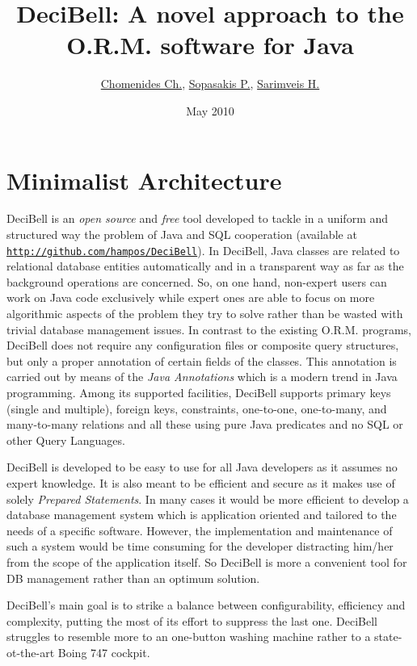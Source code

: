 \documentclass[a4paper,10pt]{article}
\title{DeciBell: A novel approach to the O.R.M. software for Java\texttrademark}
\author{\href{mailto:hampos@me.com}{Chomenides Ch.}, \href{mailto:chvng@mail.ntua.gr}{Sopasakis P.}, \href{mailto:hsarimv@central.ntua.gr}{Sarimveis H.}}
\date{May 2010}
\begin{document}
 \maketitle

\section*{Minimalist Architecture}\label{minimal}
DeciBell is an \emph{open source} and \emph{free} tool developed 
to tackle in a uniform and structured way the problem of 
Java and SQL cooperation (available at \href{http://github.com/hampos/DeciBell}{\texttt{http://github.com/hampos/DeciBell}}). In DeciBell, Java 
classes are related to relational database entities automatically and in a 
transparent way as far as the background operations are concerned. So, on 
one hand, non-expert users can work on Java code exclusively while 
expert ones are able to focus on more algorithmic aspects of the problem they 
try to solve rather than be wasted with trivial database management issues. In contrast 
to the existing O.R.M. programs, DeciBell does not require any configuration files 
or composite query structures, but only a proper annotation of certain fields 
of the classes. This annotation is carried out by means of the \emph{Java Annotations}
which is a modern trend in Java programming. Among its supported facilities, 
DeciBell supports primary keys (single and multiple), foreign keys, 
constraints, one-to-one, one-to-many, and many-to-many relations and all these using
pure Java predicates and no SQL or other Query Languages.

DeciBell is developed to be easy to use for all Java developers as it assumes no 
expert knowledge. It is also meant to be efficient and secure as it makes use of
solely \emph{Prepared Statements}. In many cases it would be more efficient
to develop a database management system which is application oriented and tailored to 
the needs of a specific software. However, the implementation and maintenance of such a 
system would be time consuming for the developer distracting him/her from the 
scope of the application itself. So DeciBell is more a convenient tool for DB management rather
than an optimum solution.

DeciBell's main goal is to strike a balance between configurability, efficiency and complexity,
putting the most of its effort to suppress the last one. DeciBell struggles to resemble more to 
an one-button washing machine rather to a state-ot-the-art Boing 747 cockpit.
\end{document}
